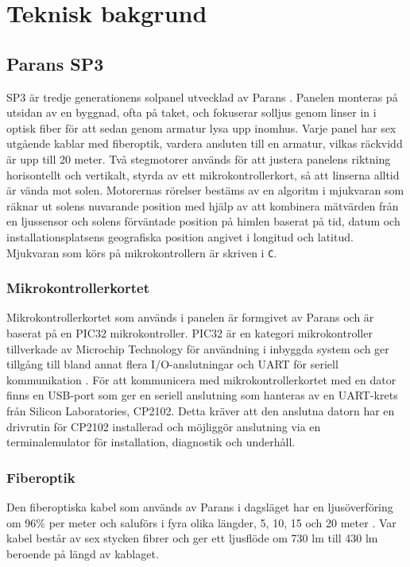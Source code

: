 \section{Teknisk bakgrund} %
\label{sec:teknisk_bakgrund}
    \subsection{Parans SP3} %
    \label{sub:parans_sp3}
        SP3 är tredje generationens solpanel utvecklad av Parans \cite{parans_manual}. Panelen monteras på utsidan av en byggnad, ofta på taket, och fokuserar solljus genom linser in i optisk fiber för att sedan genom armatur lysa upp inomhus. Varje panel har sex utgående kablar med fiberoptik, vardera ansluten till en armatur, vilkas räckvidd är upp till 20 meter. Två stegmotorer används för att justera panelens riktning horisontellt och vertikalt, styrda av ett mikrokontrollerkort, så att linserna alltid är vända mot solen. Motorernas rörelser bestäms av en algoritm i mjukvaran som räknar ut solens nuvarande position med hjälp av att kombinera mätvärden från en ljussensor och solens förväntade position på himlen baserat på tid, datum och installationsplatsens geografiska position angivet i longitud och latitud. Mjukvaran som körs på mikrokontrollern är skriven i \texttt{C}.

        \subsubsection{Mikrokontrollerkortet} %
        \label{ssub:mikrokontrollerkortet}
            Mikrokontrollerkortet som används i panelen är formgivet av Parans och är baserat på en PIC32 mikrokontroller. PIC32 är en kategori mikrokontroller tillverkade av Microchip Technology för användning i inbyggda system och ger tillgång till bland annat flera I/O-anslutningar och UART för seriell kommunikation \cite[s.~42--44]{PIC32}. För att kommunicera med mikrokontrollerkortet med en dator finns en USB-port som ger en seriell anslutning som hanteras av en UART-krets från Silicon Laboratories, CP2102. Detta kräver att den anslutna datorn har en drivrutin för CP2102 installerad och möjliggör anslutning via en terminalemulator för installation, diagnostik och underhåll.

        \subsubsection{Fiberoptik} %
        \label{ssub:fiberoptik}
            Den fiberoptiska kabel som används av Parans i dagsläget har en ljusöverföring om 96\% per meter och saluförs i fyra olika längder, 5, 10, 15 och 20 meter \cite{parans_spec}. Var kabel består av sex stycken fibrer och ger ett ljusflöde om 730 lm till 430 lm beroende på längd av kablaget.

